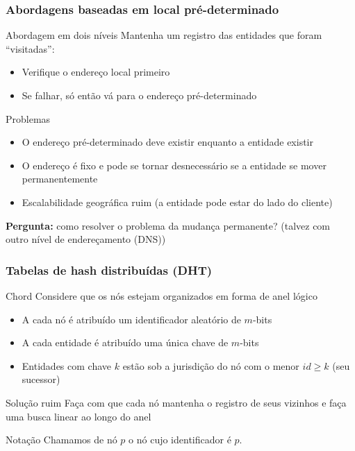 \documentclass[Ligatures=TeX,table,brazil,svgnames,usetotalslideindicator,compress,10pt]{beamer}
\begin{document}
\begin{frame}
  \frametitle{Abordagens baseadas em local pré-determinado}

  \begin{block}{Abordagem em dois níveis}
    Mantenha um registro das entidades que foram ``visitadas'':
    \begin{itemize}
    \item Verifique o endereço local primeiro
    \item Se falhar, só então vá para o endereço pré-determinado
    \end{itemize}

    \begin{block}{Problemas}
      \begin{itemize}
      \item O endereço pré-determinado deve existir enquanto a entidade existir
      \item O endereço é \alert{fixo} e pode se tornar desnecessário se a entidade se mover permanentemente
      \item Escalabilidade geográfica ruim (a entidade pode estar do lado do cliente)
      \end{itemize}
    \end{block}
  \end{block}

  \textbf{Pergunta:} como resolver o problema da mudança permanente?
  (talvez com outro nível de endereçamento (DNS))

\end{frame}

\begin{frame}
  \frametitle{Tabelas de hash distribuídas (DHT)}
  \begin{block}{Chord}
    Considere que os nós estejam organizados em forma de \alert{anel lógico}
    \begin{itemize}
    \item A cada nó é atribuído um identificador aleatório de $m$-bits
    \item A cada entidade é atribuído uma única \alert{chave} de $m$-bits
    \item Entidades com chave $k$ estão sob a jurisdição do nó com o menor $id \ge k$ (seu sucessor)
    \end{itemize}
  \end{block}

  \begin{exampleblock}{Solução ruim}
    Faça com que cada nó mantenha o registro de seus vizinhos e faça uma busca linear ao longo do anel
  \end{exampleblock}

  \begin{block}{Notação}
    Chamamos de nó $p$ o nó cujo identificador é $p$.
  \end{block}

\end{frame}
\end{document}
